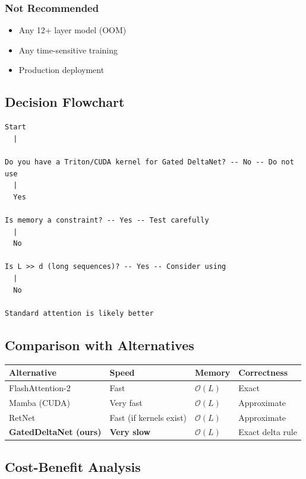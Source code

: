 \subsubsection{Not Recommended}

\begin{itemize}
\item Any 12+ layer model (OOM)
\item Any time-sensitive training
\item Production deployment

\end{itemize}
\subsection{Decision Flowchart}

\begin{lstlisting}
Start
  |
   
Do you have a Triton/CUDA kernel for Gated DeltaNet? -- No -- Do not use
  |
  Yes
   
Is memory a constraint? -- Yes -- Test carefully
  |
  No
   
Is L >> d (long sequences)? -- Yes -- Consider using
  |
  No
   
Standard attention is likely better
\end{lstlisting}

\subsection{Comparison with Alternatives}

\begin{table}[H]
\centering
\small
\begin{tabular}{llll}
\toprule
\textbf{Alternative} & \textbf{Speed} & \textbf{Memory} & \textbf{Correctness} \\
\midrule
FlashAttention-2 & Fast & $\mathcal{O}(L)$ & Exact \\
Mamba (CUDA) & Very fast & $\mathcal{O}(L)$ & Approximate \\
RetNet & Fast (if kernels exist) & $\mathcal{O}(L)$ & Approximate \\
\textbf{GatedDeltaNet (ours)} & \textbf{Very slow} & $\mathcal{O}(L)$ & Exact delta rule \\
\bottomrule
\end{tabular}
\end{table}

\subsection{Cost-Benefit Analysis}

